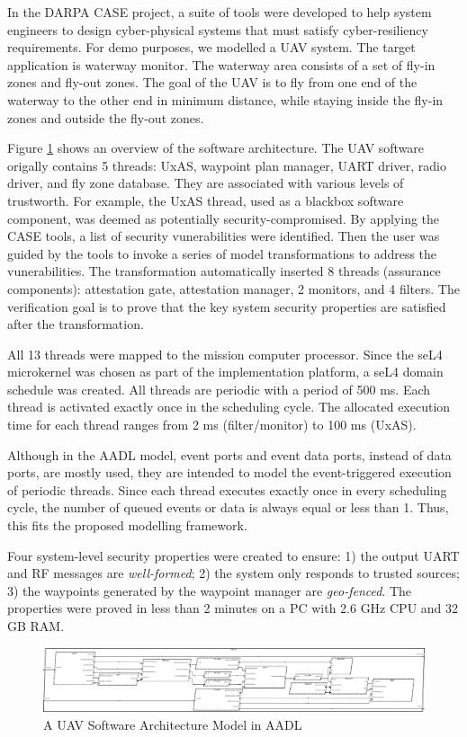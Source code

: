 In the DARPA CASE project, a suite of tools were developed to help system engineers to design cyber-physical systems that must satisfy cyber-resiliency requirements.
For demo purposes, we modelled a UAV system. The target application is waterway monitor. The waterway area consists of a set of fly-in zones and fly-out zones. The goal of the UAV is to fly from one end of the waterway to the other end in minimum distance, while staying inside the fly-in zones and outside the fly-out zones.
 
Figure \ref{SW} shows an overview of the software architecture. The UAV software origally contains 5 threads: UxAS, waypoint plan manager, UART driver, radio driver, and fly zone database. They are associated with various levels of trustworth. For example, the UxAS thread, used as a blackbox software component, was deemed as potentially security-compromised.
By applying the CASE tools, a list of security vunerabilities were identified. Then the user was guided by the tools to invoke a series of model transformations to address the vunerabilities. The transformation automatically inserted 8 threads (assurance components): attestation gate, attestation manager, 2 monitors, and 4 filters. The verification goal is to prove that the key system security properties are satisfied after the transformation.

All 13 threads were mapped to the mission computer processor. Since the seL4 microkernel was chosen as part of the implementation platform, a seL4 domain schedule was created. All threads are periodic with a period of 500 ms. Each thread is activated exactly once in the scheduling cycle. The allocated execution time for each thread ranges from 2 ms (filter/monitor) to 100 ms (UxAS).

Although in the AADL model, event ports and event data ports, instead of data ports, are mostly used, they are intended to model the event-triggered execution of periodic threads. 
Since each thread executes exactly once in every scheduling cycle, the number of queued events or data is always equal or less than 1. 
Thus, this fits the proposed modelling framework.

Four system-level security properties were created to ensure: 1) the output UART and RF messages are \emph{well-formed}; 2) the system only responds to trusted sources; 3) the waypoints generated by the waypoint manager are \emph{geo-fenced}. The properties were proved in less than 2 minutes on a PC with 2.6 GHz CPU and 32 GB RAM.

\begin{figure}[ht!]
\centering
\includegraphics[width=130mm]{sw.jpg}
\caption{A UAV Software Architecture Model in AADL \label{SW}}
\end{figure}
